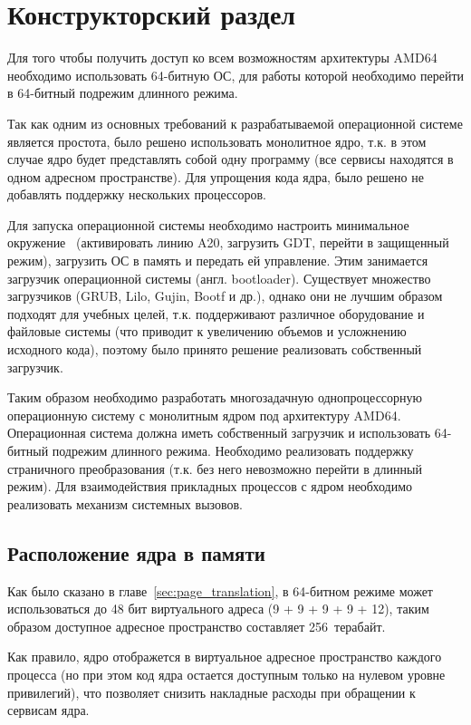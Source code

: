 \chapter{Конструкторский раздел}
\label{cha:design}

Для того чтобы получить доступ ко всем возможностям архитектуры AMD64
необходимо использовать 64-битную ОС, для работы которой необходимо перейти в 64-битный
подрежим длинного режима.

Так как одним из основных требований к разрабатываемой операционной системе
является простота, было решено использовать монолитное ядро, т.к. в этом
случае ядро будет представлять собой одну программу (все сервисы находятся в
одном адресном пространстве). Для упрощения кода ядра, было решено
не добавлять поддержку нескольких процессоров.

Для запуска операционной системы необходимо настроить минимальное окружение~\cite{mstu_os_dev_method} (активировать линию A20,
загрузить GDT, перейти в защищенный режим), загрузить ОС в память и передать ей управление.
Этим занимается загрузчик операционной системы (англ. bootloader). Существует множество загрузчиков
(GRUB, Lilo, Gujin, Bootf и др.), однако они не лучшим образом подходят для учебных целей, т.к. поддерживают
различное оборудование и файловые системы (что приводит к увеличению объемов и усложнению исходного кода),
поэтому было принято решение реализовать собственный загрузчик.

Таким образом необходимо разработать многозадачную однопроцессорную операционную систему с
монолитным ядром под архитектуру AMD64. Операционная система должна
иметь собственный загрузчик и использовать 64-битный подрежим длинного режима. Необходимо
реализовать поддержку страничного преобразования (т.к. без него невозможно перейти в длинный режим).
Для взаимодействия прикладных процессов с ядром необходимо реализовать механизм системных вызовов.


\section{Расположение ядра в памяти}
Как было сказано в главе~\ref{sec:page_translation}, в 64-битном режиме может использоваться
до 48 бит виртуального адреса (9 + 9 + 9 + 9 + 12), таким образом доступное адресное пространство
составляет 256~терабайт.

Как правило, ядро отображется в виртуальное адресное пространство каждого процесса (но при этом код ядра
остается доступным только на нулевом уровне привилегий), что позволяет снизить накладные расходы при
обращении к сервисам ядра.


